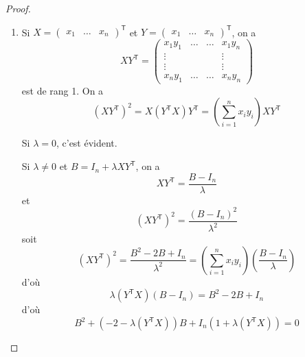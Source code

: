 \documentclass[12pt]{article}
\begin{document}
\begin{proof}
    \phantom{}
    \begin{enumerate}
        \item Si
        $X=\begin{pmatrix}
            x_{1} & \dots &x_{n}
        \end{pmatrix}^{\mathsf{T}}$ et $Y=\begin{pmatrix}
            x_{1} & \dots &x_{n}
        \end{pmatrix}^{\mathsf{T}}$, on a 
        \begin{equation}
            XY^{\mathsf{T}}=
            \begin{pmatrix}
                x_{1}y_{1}&\dots&\dots&x_{1}y_{n}\\
                \vdots & & & \vdots\\
                \vdots & & & \vdots\\
                x_{n}y_{1} & \dots & \dots & x_{n}y_{n}
            \end{pmatrix}
        \end{equation}
        est de rang 1. On a 
        \begin{equation}
            (XY^{\mathsf{T}})^{2}=X(Y^{\mathsf{T}}X)Y^{\mathsf{T}}=\left(\sum_{i=1}^{n}x_{i}y_{i}\right)XY^{\mathsf{T}}
        \end{equation}

        Si $\lambda=0$, c'est évident.

        Si $\lambda\neq0$ et $B=I_{n}+\lambda XY^{\mathsf{T}}$, on a
        \begin{equation}
            XY^{\mathsf{T}}=\frac{B-I_{n}}{\lambda}
        \end{equation}
        et 
        \begin{equation}
            (XY^{\mathsf{T}})^{2}=\frac{\left(B-I_{n}\right)^{2}}{\lambda^{2}}
        \end{equation}
        soit 
        \begin{equation}
            (XY^{\mathsf{T}})^{2}=\frac{B^{2}-2B+I_{n}}{\lambda^{2}}=\left(\sum_{i=1}^{n}x_{i}y_{i}\right)\left(\frac{B-I_{n}}{\lambda}\right)
        \end{equation}
        d'où 
        \begin{equation}
            \lambda\left(Y^{\mathsf{T}}X\right)\left(B-I_{n}\right)=B^{2}-2B+I_{n}
        \end{equation}
        d'où
        \begin{equation}
            B^{2}+\left(-2-\lambda\left(Y^{\mathsf{T}}X\right)\right)B+I_{n}\left(1+\lambda\left(Y^{\mathsf{T}}X\right)\right)=0
        \end{equation}


\end{enumerate}
\end{proof}
\end{document}
